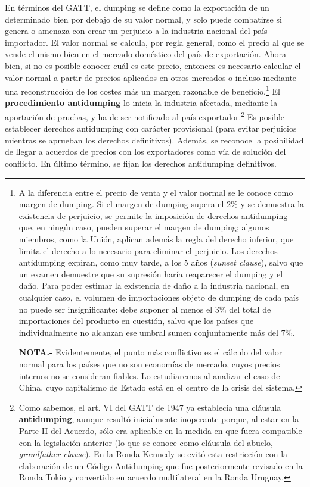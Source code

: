 \documentclass[10pt,a4paper]{article}
\begin{document}
En términos del GATT, el dumping se define como la exportación de un determinado bien por debajo de su valor normal, y solo puede combatirse si genera o amenaza con crear un perjuicio a la industria nacional del país importador. El valor normal se calcula, por regla general, como el precio al que se vende el mismo bien en el mercado doméstico del país de exportación. Ahora bien, si no es posible conocer cuál es este precio, entonces es necesario calcular el valor normal a partir de precios aplicados en otros mercados o incluso mediante una reconstrucción de los costes más un margen razonable de beneficio.\footnote{%
  A la diferencia entre el precio de venta y el valor normal se le conoce como margen de dumping. Si el margen de dumping supera el $2\%$ y se demuestra la existencia de perjuicio, se permite la imposición de derechos antidumping que, en ningún caso, pueden superar el margen de dumping; algunos miembros, como la Unión, aplican además la regla del derecho inferior, que limita el derecho a lo necesario para eliminar el perjuicio. Los derechos antidumping expiran, como muy tarde, a los $5$ años (\textit{sunset clause}), salvo que un examen demuestre que su supresión haría reaparecer el dumping y el daño. Para poder estimar la existencia de daño a la industria nacional, en cualquier caso, el volumen de importaciones objeto de dumping de cada país no puede ser insignificante: debe suponer al menos el $3\%$ del total de importaciones del producto en cuestión, salvo que los países que individualmente no alcanzan ese umbral sumen conjuntamente más del $7\%$.

  \textbf{NOTA.-} Evidentemente, el punto más conflictivo es el cálculo del valor normal para los países que no son economías de mercado, cuyos precios internos no se consideran fiables. Lo estudiaremos al analizar el caso de China, cuyo capitalismo de Estado está en el centro de la crisis del sistema.
} El \textbf{procedimiento antidumping} lo inicia la industria afectada, mediante la aportación de pruebas, y ha de ser notificado al país exportador.\footnote{%
  Como sabemos, el art. VI del GATT de 1947 ya establecía una cláusula \textbf{antidumping}, aunque resultó inicialmente inoperante porque, al estar en la Parte II del Acuerdo, sólo era aplicable en la medida en que fuera compatible con la legislación anterior (lo que se conoce como cláusula del abuelo, \textit{grandfather clause}). En la Ronda Kennedy se evitó esta restricción con la elaboración de un Código Antidumping que fue posteriormente revisado en la Ronda Tokio y convertido en acuerdo multilateral en la Ronda Uruguay.
} Es posible establecer derechos antidumping con carácter provisional (para evitar perjuicios mientras se aprueban los derechos definitivos). Además, se reconoce la posibilidad de llegar a acuerdos de precios con los exportadores como vía de solución del conflicto. En último término, se fijan los derechos antidumping definitivos.
\end{document}

